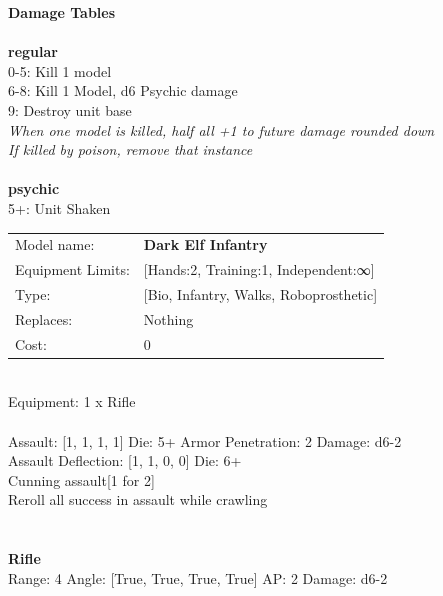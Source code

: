 {{\bf Damage Tables} \\
\ \\ {\bf regular } \\
0-5: Kill 1 model \\
6-8: Kill 1 Model, d6 Psychic damage \\
9: Destroy unit base \\
{{\it When one model is killed, half all +1 to future damage rounded down}} \\
{{\it If killed by poison, remove that instance}} \\
\ \\ {\bf psychic } \\
5+: Unit Shaken \\


\noindent
\begin{tabular}{ll}
Model name: &{\bf Dark Elf Infantry } \\
Equipment Limits: &[Hands:2, Training:1, Independent:∞] \\
Type: &[Bio, Infantry, Walks, Roboprosthetic] \\
Replaces: &Nothing \\
Cost: & 0\\
\end{tabular}
\ \\
Equipment: 1 x Rifle \\
\ \\
Assault: [1, 1, 1, 1] Die: 5+ Armor Penetration: 2 Damage: d6-2 \\
Assault Deflection: [1, 1, 0, 0] Die: 6+\\
\indent Cunning assault[1 for 2]\\ 
Reroll all success in assault while crawling\\ 
 
\ \\

\ \\
{\bf Rifle } \\



Range: 4  Angle: [True, True, True, True] AP: 2 Damage: d6-2 \\




 
\ \\













}
